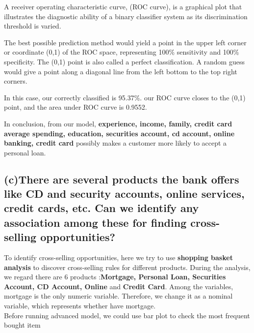\documentclass[]{article}
\begin{document}
A receiver operating characteristic curve, (ROC curve), is a graphical plot that illustrates the diagnostic ability of a binary classifier system as its discrimination threshold is varied.

The best possible prediction method would yield a point in the upper left corner or coordinate (0,1) of the ROC space, representing 100\% sensitivity and 100\% specificity. The (0,1) point is also called a perfect classification. A random guess would give a point along a diagonal line from the left bottom to the top right corners.

In this case, our correctly classified is 95.37\%. our ROC curve closes to the (0,1) point, and the area under ROC curve is 0.9552. 

In conclusion, from our model, \textbf{experience, income, family, credit card average spending, education, securities account, cd account, online banking, credit card} possibly makes a customer more likely to accept a personal loan.

\subsection{(c)There are several products the bank offers like CD and security accounts, online services, credit cards, etc. Can we identify any association among these for finding cross-selling opportunities?}
To identify cross-selling opportunities, here we try to use \textbf{shopping basket analysis} to discover cross-selling rules for different products. During the analysis, we regard there are 6 products :\textbf{Mortgage, Personal Loan, Securities Account, CD Account, Online} and \textbf{Credit Card}. Among the variables, mortgage is the only numeric variable. Therefore, we change it as a nominal variable, which represents whether have mortgage. \\

Before running advanced model, we could use bar plot to check the most frequent bought item
\end{document}
